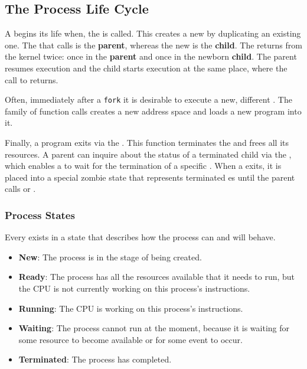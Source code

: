 \subsection{The Process Life Cycle}\label{subsec:Process_Life_Cycle}
A  begins its life when, the   is called.
This creates a new  by duplicating an existing one.
The  that calls  is the \textbf{parent}, whereas the new  is the \textbf{child}.
The   returns from the kernel twice: once in the \textbf{parent} and once in the newborn \textbf{child}.
The parent resumes execution and the child starts execution at the same place, where the call to  returns.

Often, immediately after a \texttt{fork} it is desirable to execute a new, different .
The  family of function calls creates a new address space and loads a new program into it.

Finally, a program exits via the  .
This function terminates the  and frees all its resources.
A parent  can inquire about the status of a terminated child via the  , which enables a  to wait for the termination of a specific .
When a  exits, it is placed into a special zombie state that represents terminated es until the parent calls  or .

\subsubsection{Process States}\label{subsubsec:Process_States}
Every  exists in a state that describes how the process can and will behave.
\begin{itemize}[noitemsep]
\item \textbf{New}: The process is in the stage of being created.
\item \textbf{Ready}: The process has all the resources available that it needs to run, but the CPU is not currently working on this process's instructions.
\item \textbf{Running}: The CPU is working on this process's instructions.
\item \textbf{Waiting}: The process cannot run at the moment, because it is waiting for some resource to become available or for some event to occur.
\item \textbf{Terminated}: The process has completed.
\end{itemize}

